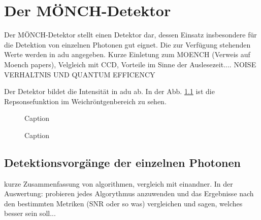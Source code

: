 \chapter{Der MÖNCH-Detektor}
\label{text:moench_theorie}
Der MÖNCH-Detektor stellt einen Detektor dar, dessen Einsatz insbesondere für die Detektion von einzelnen Photonen gut eignet. Die zur Verfügung stehenden Werte werden in \gls{adu} angegeben. \cite{bergamaschi_monch_2018}
Kurze Einletung zum MOENCH (Verweis auf Moench papers), Velgleich mit CCD, Vorteile 
im Sinne der Auslesezeit.... NOISE VERHALTNIS  UND QUANTUM EFFICENCY

Der Detektor bildet die Intensität in \gls{adu} ab. In der Abb. \ref{fig:response_moench} ist die Repsonsefunktion im Weichröntgenbereich zu sehen. 
\begin{figure}[H]
    \centering
    
    \caption{Caption}
    \label{fig:response_moench}
\end{figure}
\begin{figure}[H]
    \centering
    
    \caption{Caption}
    \label{fig:noise_moench}
\end{figure}
\section{Detektionsvorgänge der einzelnen Photonen}
\label{text:single_photon_theorie}
kurze Zusammenfassung von algorithmen, vergleich mit einandner. In der Auswertung: probieren jedes Algorythmus anzuwenden und das Ergebnisse nach den bestimmten Metriken (SNR oder so was) vergleichen und sagen, welches besser sein soll...
